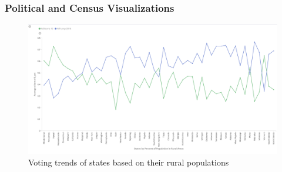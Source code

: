 \documentclass[bibliography=totoc]{article}
\begin{document}
\subsubsection{Political and Census Visualizations}
\begin{figure}
  \centering
  \includegraphics[width=\linewidth]{rural_voters_visualization.png}
 \caption{Voting trends of states based on their rural populations}
  \label{fig:rural_voter_trends}
\end{figure}
\end{document}
